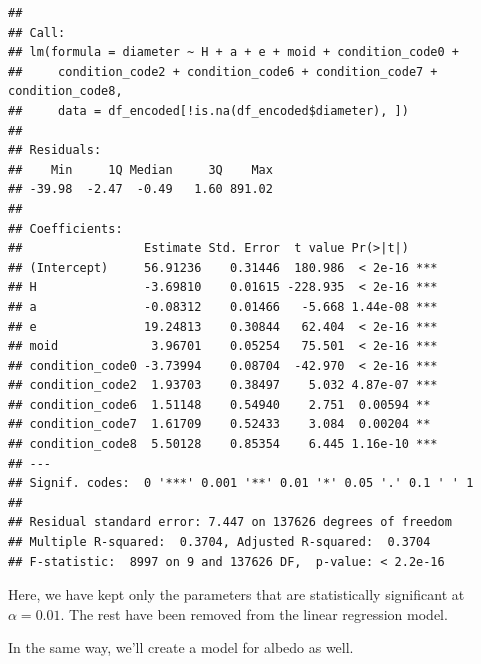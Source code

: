 \documentclass[
]{article}
\newenvironment{Shaded}{\begin{snugshade}}{\end{snugshade}}
\newcommand{\AttributeTok}[1]{\textcolor[rgb]{0.13,0.29,0.53}{#1}}
\newcommand{\FunctionTok}[1]{\textcolor[rgb]{0.13,0.29,0.53}{\textbf{#1}}}
\newcommand{\NormalTok}[1]{#1}
\newcommand{\OtherTok}[1]{\textcolor[rgb]{0.56,0.35,0.01}{#1}}
\newcommand{\SpecialCharTok}[1]{\textcolor[rgb]{0.81,0.36,0.00}{\textbf{#1}}}
\begin{document}
\begin{verbatim}
## 
## Call:
## lm(formula = diameter ~ H + a + e + moid + condition_code0 + 
##     condition_code2 + condition_code6 + condition_code7 + condition_code8, 
##     data = df_encoded[!is.na(df_encoded$diameter), ])
## 
## Residuals:
##    Min     1Q Median     3Q    Max 
## -39.98  -2.47  -0.49   1.60 891.02 
## 
## Coefficients:
##                 Estimate Std. Error  t value Pr(>|t|)    
## (Intercept)     56.91236    0.31446  180.986  < 2e-16 ***
## H               -3.69810    0.01615 -228.935  < 2e-16 ***
## a               -0.08312    0.01466   -5.668 1.44e-08 ***
## e               19.24813    0.30844   62.404  < 2e-16 ***
## moid             3.96701    0.05254   75.501  < 2e-16 ***
## condition_code0 -3.73994    0.08704  -42.970  < 2e-16 ***
## condition_code2  1.93703    0.38497    5.032 4.87e-07 ***
## condition_code6  1.51148    0.54940    2.751  0.00594 ** 
## condition_code7  1.61709    0.52433    3.084  0.00204 ** 
## condition_code8  5.50128    0.85354    6.445 1.16e-10 ***
## ---
## Signif. codes:  0 '***' 0.001 '**' 0.01 '*' 0.05 '.' 0.1 ' ' 1
## 
## Residual standard error: 7.447 on 137626 degrees of freedom
## Multiple R-squared:  0.3704, Adjusted R-squared:  0.3704 
## F-statistic:  8997 on 9 and 137626 DF,  p-value: < 2.2e-16
\end{verbatim}

Here, we have kept only the parameters that are statistically
significant at \(\alpha=0.01\). The rest have been removed from the
linear regression model.

In the same way, we'll create a model for albedo as well.

\begin{Shaded}
\end{Shaded}
\end{document}
